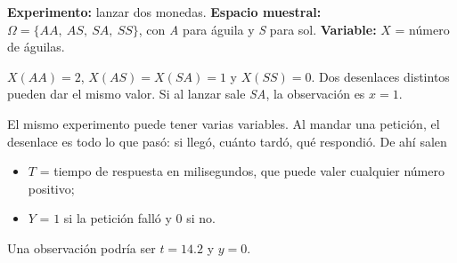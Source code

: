 \documentclass[11pt,letterpaper]{article}
\begin{document}
\begin{ejemplo}
    \textbf{Experimento:} lanzar dos monedas.
    \textbf{Espacio muestral:} $\Omega = \{\textit{AA},\ \textit{AS},\
    \textit{SA},\ \textit{SS}\}$, con \textit{A} para águila y
    \textit{S} para sol. \textbf{Variable:} $X$ = número de águilas.
    \begin{center}
    \end{center}
    $X(\textit{AA}) = 2$, $X(\textit{AS}) = X(\textit{SA}) = 1$ y
    $X(\textit{SS}) = 0$. Dos desenlaces distintos pueden dar el mismo
    valor. Si al lanzar sale \textit{SA}, la observación es $x = 1$.
\end{ejemplo}

\begin{ejemplo}
    El mismo experimento puede tener varias variables. Al mandar una
    petición, el desenlace es todo lo que pasó: si llegó, cuánto tardó,
    qué respondió. De ahí salen
    \begin{itemize}[itemsep=0.2em]
        \item $T$ = tiempo de respuesta en milisegundos, que puede
              valer cualquier número positivo;
        \item $Y$ = $1$ si la petición falló y $0$ si no.
    \end{itemize}
    Una observación podría ser $t = 14.2$ y $y = 0$.
\end{ejemplo}
\end{document}
